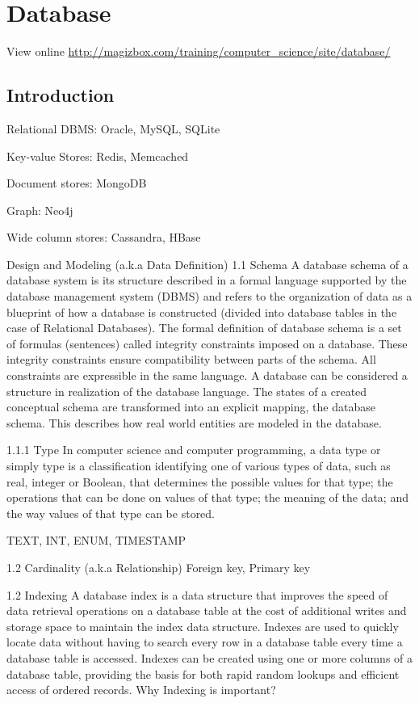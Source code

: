 \chapter{Database}

View online \href{http://magizbox.com/training/computer_science/site/database/}{http://magizbox.com/training/computer_science/site/database/}

\section{Introduction}

Relational DBMS: Oracle, MySQL, SQLite

Key-value Stores: Redis, Memcached

Document stores: MongoDB

Graph: Neo4j

Wide column stores: Cassandra, HBase

Design and Modeling (a.k.a Data Definition)
1.1 Schema
A database schema of a database system is its structure described in a formal language supported by the database management system (DBMS) and refers to the organization of data as a blueprint of how a database is constructed (divided into database tables in the case of Relational Databases). The formal definition of database schema is a set of formulas (sentences) called integrity constraints imposed on a database. These integrity constraints ensure compatibility between parts of the schema. All constraints are expressible in the same language. A database can be considered a structure in realization of the database language. The states of a created conceptual schema are transformed into an explicit mapping, the database schema. This describes how real world entities are modeled in the database.

1.1.1 Type
In computer science and computer programming, a data type or simply type is a classification identifying one of various types of data, such as real, integer or Boolean, that determines the possible values for that type; the operations that can be done on values of that type; the meaning of the data; and the way values of that type can be stored.

TEXT, INT, ENUM, TIMESTAMP

1.2 Cardinality (a.k.a Relationship)
Foreign key, Primary key

1.2 Indexing
A database index is a data structure that improves the speed of data retrieval operations on a database table at the cost of additional writes and storage space to maintain the index data structure. Indexes are used to quickly locate data without having to search every row in a database table every time a database table is accessed. Indexes can be created using one or more columns of a database table, providing the basis for both rapid random lookups and efficient access of ordered records. Why Indexing is important?

